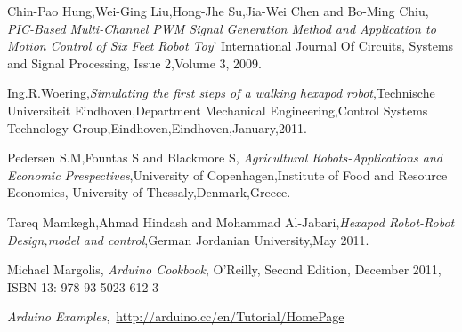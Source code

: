 \documentclass{report}
\begin{document}
\renewcommand{\bibname}{REFERENCES}
\begin{thebibliography}{9}

  Chin-Pao Hung,Wei-Ging Liu,Hong-Jhe Su,Jia-Wei Chen and Bo-Ming Chiu, 
  \emph{PIC-Based Multi-Channel PWM Signal Generation Method and Application to Motion Control of Six Feet Robot Toy}'
  International Journal Of Circuits, Systems and Signal Processing,
  Issue 2,Volume 3,
  2009.

Ing.R.Woering,\emph{Simulating the first steps of a walking hexapod robot},Technische Universiteit Eindhoven,Department Mechanical Engineering,Control Systems Technology Group,Eindhoven,Eindhoven,January,2011.

Pedersen S.M,Fountas S and Blackmore S,
\emph{Agricultural Robots-Applications and Economic Prespectives},University of Copenhagen,Institute of Food and Resource Economics, University of Thessaly,Denmark,Greece.

Tareq Mamkegh,Ahmad Hindash and Mohammad Al-Jabari,\emph{Hexapod Robot-Robot Design,model and control},German Jordanian University,May 2011.

Michael Margolis,
\emph{Arduino Cookbook},
O'Reilly,
Second Edition,
December 2011,
ISBN 13: 978-93-5023-612-3

\emph{Arduino Examples},\ \hyperref[tosee]{\color{red}\url{http://arduino.cc/en/Tutorial/HomePage}}

\end{thebibliography}
\end{document}
